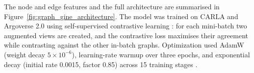 The node and edge features and the full architecture are summarised in Figure~\ref{fig:graph_gine_architecture}. The model was trained on CARLA and Argoverse 2.0 using self-supervised contrastive learning \cite{chen2020simple,hu2020strategiespretraininggraphneural}: for each mini-batch two augmented views are created, and the contrastive loss maximises their agreement while contrasting against the other in-batch graphs. Optimization used AdamW (weight decay $5 \times 10^{-6}$), learning-rate warmup over three epochs, and exponential decay (initial rate 0.0015, factor 0.85) across 15 training stages \cite{Fey/Lenssen/2019}.

